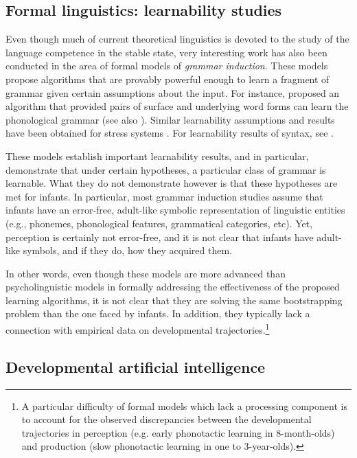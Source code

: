\documentclass[jou,apacite]{apa6}
\begin{document}
\subsection{Formal linguistics: learnability studies}
Even though much of current theoretical linguistics is devoted to the study of the language competence in the stable state, very interesting work has also been conducted in the area of formal models of \emph{grammar induction}. These models propose algorithms that are provably powerful enough to learn a fragment of grammar given certain assumptions about the input.  For instance,  proposed an algorithm that provided pairs of surface and underlying word forms can learn the phonological grammar (see also ). Similar learnability assumptions and results have been obtained for stress systems \cite{dresher_1990,tesar_2000}. For learnability results of syntax, see .





These models establish important learnability results, and in particular, demonstrate that under certain hypotheses, a particular class of grammar is learnable.  What they do not demonstrate however is that these hypotheses are met for infants. In particular, most grammar induction studies assume that infants have an error-free, adult-like symbolic representation of linguistic entities (e.g., phonemes, phonological features, grammatical categories, etc). Yet, perception is certainly not error-free, and it is not clear that infants have adult-like symbols, and if they do, how they acquired them.

In other words, even though these models are more advanced than psycholinguistic models in formally addressing the effectiveness of the proposed learning algorithms, it is not clear that they are solving the same bootstrapping problem than the one faced by infants. In addition, they typically lack a connection with empirical data on developmental trajectories.\footnote{A particular difficulty of formal models which lack a processing component is to account for the observed discrepancies between the developmental trajectories in perception (e.g. early phonotactic learning in 8-month-olds) and production (slow phonotactic learning in one to 3-year-olds).}





\subsection{Developmental artificial intelligence}
\end{document}
